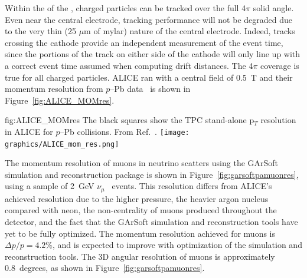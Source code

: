 Within the  of the , charged particles can be tracked over the full 4$\pi$ solid angle.  Even near the central electrode, tracking performance will not be degraded due to the very thin (25 $\mu$m of mylar) nature of the central electrode.   Indeed, tracks crossing the cathode provide an independent measurement of the event time, since the portions of the track on either side of the cathode will only line up with a correct event time assumed when computing drift distances. The 4$\pi$ coverage is true for all charged particles.  ALICE ran with a central field of 0.5~T and their momentum resolution from $p$--Pb data~\cite{Abelev:2014ffa} is shown in Figure~\ref{fig:ALICE_MOMres}.
%
\begin{dunefigure}{fig:ALICE_MOMres}
{The black squares show the TPC stand-alone p$_T$ resolution in ALICE for $p$--Pb collisions. From Ref.~\cite{Abelev:2014ffa}.}
\texttt{[image: graphics/ALICE\_mom\_res.png]}
\end{dunefigure}
%
The momentum resolution of muons in neutrino scatters using the GArSoft simulation and reconstruction package is shown in Figure~\ref{fig:garsoftpamuonres}, using a sample of 2~GeV $\nu_\mu$~ events.  This resolution differs from ALICE's achieved resolution due to the higher pressure, the heavier argon nucleus compared with neon, the non-centrality of muons produced throughout the detector, and the fact that the GArSoft simulation and reconstruction tools have yet to be fully optimized.  The momentum resolution achieved for muons is $\Delta p/p = 4.2$\%, and is expected to improve with optimization of the simulation and reconstruction tools.  The 3D angular resolution of muons is approximately 0.8~degrees, as shown in Figure~\ref{fig:garsoftpamuonres}. 



